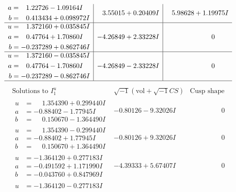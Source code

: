 \documentclass[1p]{elsarticle_modified}
\theoremstyle{definition}
\newcommand{\I}{\sqrt{-1}}
\begin{document}
$$\begin{array}{c|c|c}
\begin{aligned}
a &= \phantom{-}1.22726 - 1.09164 I \\
b &= \phantom{-}0.413434 + 0.098972 I\end{aligned}
 & \phantom{-}3.55015 + 0.20409 I & \phantom{-}5.98628 + 1.19975 I \\ \hline\begin{aligned}
u &= \phantom{-}1.372160 + 0.035845 I \\
a &= \phantom{-}0.47764 + 1.70860 I \\
b &= -0.237289 + 0.862746 I\end{aligned}
 & -4.26849 + 2.33228 I & \phantom{-0.000000 } 0 \\ \hline\begin{aligned}
u &= \phantom{-}1.372160 - 0.035845 I \\
a &= \phantom{-}0.47764 - 1.70860 I \\
b &= -0.237289 - 0.862746 I\end{aligned}
 & -4.26849 - 2.33228 I & \phantom{-0.000000 } 0\\
 \hline 
 \end{array}$$\newpage$$\begin{array}{c|c|c}  
\text{Solutions to }I^u_{1}& \I (\text{vol} + \sqrt{-1}CS) & \text{Cusp shape}\\
 \hline 
\begin{aligned}
u &= \phantom{-}1.354390 + 0.299440 I \\
a &= -0.88402 - 1.77945 I \\
b &= \phantom{-}0.150670 - 1.364490 I\end{aligned}
 & -0.80126 - 9.32026 I & \phantom{-0.000000 } 0 \\ \hline\begin{aligned}
u &= \phantom{-}1.354390 - 0.299440 I \\
a &= -0.88402 + 1.77945 I \\
b &= \phantom{-}0.150670 + 1.364490 I\end{aligned}
 & -0.80126 + 9.32026 I & \phantom{-0.000000 } 0 \\ \hline\begin{aligned}
u &= -1.364120 + 0.277183 I \\
a &= -0.491592 + 1.171990 I \\
b &= -0.043760 + 0.847969 I\end{aligned}
 & -4.39333 + 5.67407 I & \phantom{-0.000000 } 0 \\ \hline\begin{aligned}
u &= -1.364120 - 0.277183 I \\

\end{aligned}
\end{array}$$
\end{document}
